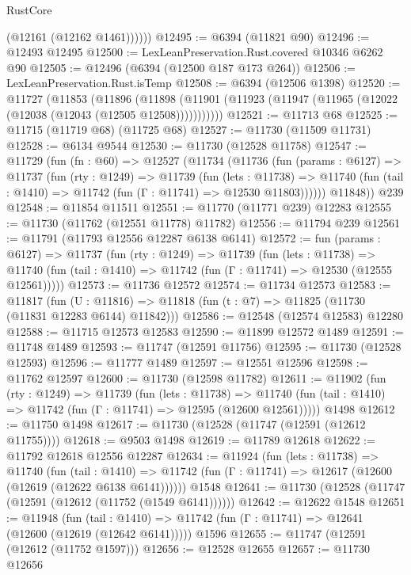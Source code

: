 \begin{lexlean}{RustCore}
\begin{coremodule}
            (@12161 (@12162 @1461))))))
@12495 := @6394 (@11821 @90)
@12496 := @12493 @12495
@12500 := LexLeanPreservation.Rust.covered @10346 @6262 @90
@12505 := @12496 (@6394 (@12500 @187 @173 @264))
@12506 := LexLeanPreservation.Rust.isTemp
@12508 := @6394 (@12506 @1398)
@12520 := @11727
    (@11853
      (@11896
        (@11898 (@11901 (@11923 (@11947 (@11965 (@12022 (@12038 (@12043 (@12505 @12508)))))))))))
@12521 := @11713 @68
@12525 := @11715 (@11719 @68) (@11725 @68)
@12527 := @11730 (@11509 @11731)
@12528 := @6134 @9544
@12530 := @11730 (@12528 @11758)
@12547 := @11729
    (fun (fn : @60) =>
    @12527
      (@11734
        (@11736
          (fun (params : @6127) =>
          @11737
            (fun (rty : @1249) =>
            @11739
              (fun (lets : @11738) =>
              @11740 (fun (tail : @1410) => @11742 (fun (Γ : @11741) => @12530 @11803))))))
        @11848))
    @239
@12548 := @11854 @11511
@12551 := @11770 (@11771 @239) @12283
@12555 := @11730 (@11762 (@12551 @11778) @11782)
@12556 := @11794 @239
@12561 := @11791 (@11793 @12556 @12287 @6138 @6141)
@12572 := fun (params : @6127) =>
  @11737
    (fun (rty : @1249) =>
    @11739
      (fun (lets : @11738) =>
      @11740 (fun (tail : @1410) => @11742 (fun (Γ : @11741) => @12530 (@12555 @12561)))))
@12573 := @11736 @12572
@12574 := @11734 @12573
@12583 := @11817
    (fun (U : @11816) => @11818 (fun (t : @7) => @11825 (@11730 (@11831 @12283 @6144) @11842)))
@12586 := @12548 (@12574 @12583) @12280
@12588 := @11715 @12573 @12583
@12590 := @11899 @12572 @1489
@12591 := @11748 @1489
@12593 := @11747 (@12591 @11756)
@12595 := @11730 (@12528 @12593)
@12596 := @11777 @1489
@12597 := @12551 @12596
@12598 := @11762 @12597
@12600 := @11730 (@12598 @11782)
@12611 := @11902
    (fun (rty : @1249) =>
    @11739
      (fun (lets : @11738) =>
      @11740 (fun (tail : @1410) => @11742 (fun (Γ : @11741) => @12595 (@12600 @12561)))))
    @1498
@12612 := @11750 @1498
@12617 := @11730 (@12528 (@11747 (@12591 (@12612 @11755))))
@12618 := @9503 @1498
@12619 := @11789 @12618
@12622 := @11792 @12618 @12556 @12287
@12634 := @11924
    (fun (lets : @11738) =>
    @11740
      (fun (tail : @1410) =>
      @11742 (fun (Γ : @11741) => @12617 (@12600 (@12619 (@12622 @6138 @6141))))))
    @1548
@12641 := @11730 (@12528 (@11747 (@12591 (@12612 (@11752 (@1549 @6141))))))
@12642 := @12622 @1548
@12651 := @11948
    (fun (tail : @1410) => @11742 (fun (Γ : @11741) => @12641 (@12600 (@12619 (@12642 @6141)))))
    @1596
@12655 := @11747 (@12591 (@12612 (@11752 @1597)))
@12656 := @12528 @12655
@12657 := @11730 @12656

\end{coremodule}
\end{lexlean}
